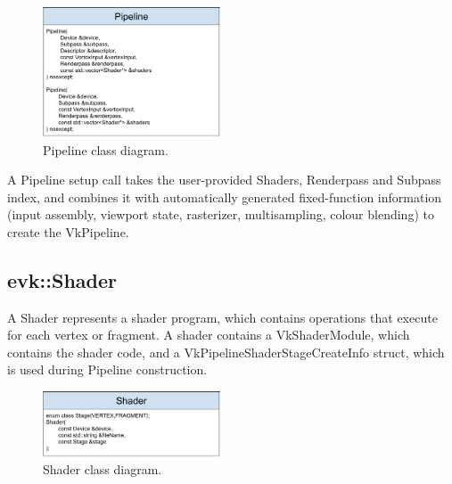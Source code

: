 \documentclass[12pt]{report}
\newcommand{\figurewidth}{0.55\textwidth}
\newcommand{\imagewidth}{0.47\textwidth}
\theoremstyle{definition}
\begin{document}
        \begin{figure}[h]
          \centering
          \includegraphics[width=\imagewidth]{images/class_pipeline.png}
          \caption{Pipeline class diagram.}
          \label{fig:class_pipeline}
        \end{figure}

        A Pipeline setup call takes the user-provided Shaders, Renderpass and
        Subpass index, and combines it with automatically generated
        fixed-function information (input assembly, viewport state,
        rasterizer, multisampling, colour blending) to create the VkPipeline.

      \subsection{evk::Shader}

        A Shader represents a shader program, which contains operations that
        execute for each vertex or fragment. A shader contains a
        VkShaderModule, which contains the shader code, and a
        VkPipelineShaderStageCreateInfo struct, which is used during
        Pipeline construction.

        \begin{figure}
          \centering
          \includegraphics[width=\imagewidth]{images/class_shader.png}
          \caption{Shader class diagram.}
          \label{fig:class_shader}
        \end{figure}
\end{document}
